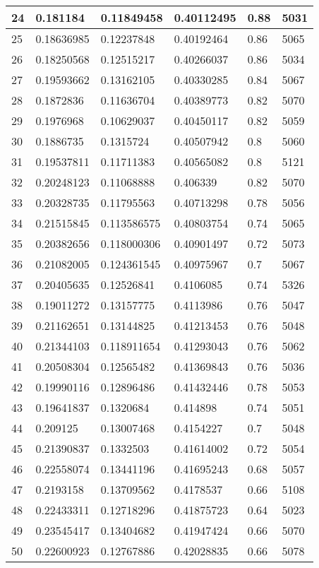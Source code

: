 \begin{longtable}{|l|l|l|l|l|l|}
24 & 0.181184 & 0.11849458 & 0.40112495 & 0.88 & 5031 \\ \hline 
25 & 0.18636985 & 0.12237848 & 0.40192464 & 0.86 & 5065 \\ \hline 
26 & 0.18250568 & 0.12515217 & 0.40266037 & 0.86 & 5034 \\ \hline 
27 & 0.19593662 & 0.13162105 & 0.40330285 & 0.84 & 5067 \\ \hline 
28 & 0.1872836 & 0.11636704 & 0.40389773 & 0.82 & 5070 \\ \hline 
29 & 0.1976968 & 0.10629037 & 0.40450117 & 0.82 & 5059 \\ \hline 
30 & 0.1886735 & 0.1315724 & 0.40507942 & 0.8 & 5060 \\ \hline 
31 & 0.19537811 & 0.11711383 & 0.40565082 & 0.8 & 5121 \\ \hline 
32 & 0.20248123 & 0.11068888 & 0.406339 & 0.82 & 5070 \\ \hline 
33 & 0.20328735 & 0.11795563 & 0.40713298 & 0.78 & 5056 \\ \hline 
34 & 0.21515845 & 0.113586575 & 0.40803754 & 0.74 & 5065 \\ \hline 
35 & 0.20382656 & 0.118000306 & 0.40901497 & 0.72 & 5073 \\ \hline 
36 & 0.21082005 & 0.124361545 & 0.40975967 & 0.7 & 5067 \\ \hline 
37 & 0.20405635 & 0.12526841 & 0.4106085 & 0.74 & 5326 \\ \hline 
38 & 0.19011272 & 0.13157775 & 0.4113986 & 0.76 & 5047 \\ \hline 
39 & 0.21162651 & 0.13144825 & 0.41213453 & 0.76 & 5048 \\ \hline 
40 & 0.21344103 & 0.118911654 & 0.41293043 & 0.76 & 5062 \\ \hline 
41 & 0.20508304 & 0.12565482 & 0.41369843 & 0.76 & 5036 \\ \hline 
42 & 0.19990116 & 0.12896486 & 0.41432446 & 0.78 & 5053 \\ \hline 
43 & 0.19641837 & 0.1320684 & 0.414898 & 0.74 & 5051 \\ \hline 
44 & 0.209125 & 0.13007468 & 0.4154227 & 0.7 & 5048 \\ \hline 
45 & 0.21390837 & 0.1332503 & 0.41614002 & 0.72 & 5054 \\ \hline 
46 & 0.22558074 & 0.13441196 & 0.41695243 & 0.68 & 5057 \\ \hline 
47 & 0.2193158 & 0.13709562 & 0.4178537 & 0.66 & 5108 \\ \hline 
48 & 0.22433311 & 0.12718296 & 0.41875723 & 0.64 & 5023 \\ \hline 
49 & 0.23545417 & 0.13404682 & 0.41947424 & 0.66 & 5070 \\ \hline 
50 & 0.22600923 & 0.12767886 & 0.42028835 & 0.66 & 5078 \\ \hline 
\end{longtable}